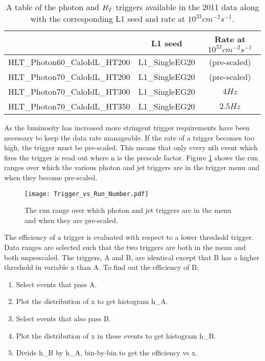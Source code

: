 \begin{table}
\begin{center}
\begin{tabular}{|l|c|c|}
\hline
 & L1 seed & Rate at $10^{33}\unit{cm^{-2}s^{-1}}$ \\
\hline
HLT\_Photon60\_CaloIdL\_HT200 & L1\_SingleEG20 & (pre-scaled) \\
HLT\_Photon70\_CaloIdL\_HT200 & L1\_SingleEG20 & (pre-scaled) \\
HLT\_Photon70\_CaloIdL\_HT300 & L1\_SingleEG20 & $4\unit{Hz}$ \\
HLT\_Photon70\_CaloIdL\_HT350 & L1\_SingleEG20 & $2.5\unit{Hz}$ \\
\hline
\end{tabular}
\end{center}
\caption{A table of the photon and $H_{T}$ triggers available in the 2011 data
along with the corresponding L1 seed and rate at $10^{33}\unit{cm^{-2}s^{-1}}$.}
\label{tab:Triggers}
\end{table}

As the luminosity has increased more stringent trigger requirements have been 
necessary to keep the data rate manageable. If the rate of a trigger becomes too
high, the trigger must be pre-scaled. This means that only every nth event which
fires the trigger is read out where n is the prescale factor. Figure 
\ref{fig:Trigger_vs_Run_Number} shows the run ranges over which the various 
photon and jet triggers are in the trigger menu and when they become pre-scaled.
\\

\begin{figure}
\begin{center}
\texttt{[image: Trigger\_vs\_Run\_Number.pdf]}
\end{center}
\caption{The run range over which photon and jet triggers are in the menu and
when they are pre-scaled.}
\label{fig:Trigger_vs_Run_Number}
\end{figure}

The efficiency of a trigger is evaluated with respect to a lower threshold
trigger. Data ranges are selected such that the two triggers are both in the
menu and both unprescaled. The triggers, A and B, are identical except that B 
has a higher threshold in variable x than A. To find out the efficiency of B:

\begin{enumerate}
\item Select events that pass A.
\item Plot the distribution of x to get histogram h\_A.
\item Select events that also pass B.
\item Plot the distribution of x in these events to get histogram h\_B.
\item Divide h\_B by h\_A, bin-by-bin to get the efficiency vs x.
\end{enumerate}

